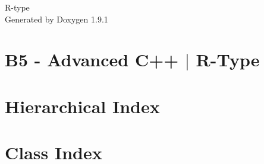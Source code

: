\let\mypdfximage\pdfximage\def\pdfximage{\immediate\mypdfximage}\documentclass[twoside]{book}
\newcommand{\+}{\discretionary{\mbox{\scriptsize$\hookleftarrow$}}{}{}}
\newcommand{\clearemptydoublepage}{%
  \newpage{\pagestyle{empty}\cleardoublepage}%
}
\begin{document}
\raggedbottom

\hypersetup{pageanchor=false,
             bookmarksnumbered=true,
             pdfencoding=unicode
            }
\begin{titlepage}
\vspace*{7cm}
\begin{center}%
{\Large R-\/type }\\
\vspace*{1cm}
{\large Generated by Doxygen 1.9.1}\\
\end{center}
\end{titlepage}
\clearemptydoublepage
{}
\tableofcontents
\clearemptydoublepage
{}
\hypersetup{pageanchor=true}

\chapter{B5 -\/ Advanced C++ $\vert$ R-\/\+Type}
\label{index}\hypertarget{index}{}
\chapter{Hierarchical Index}

\chapter{Class Index}

\end{document}
